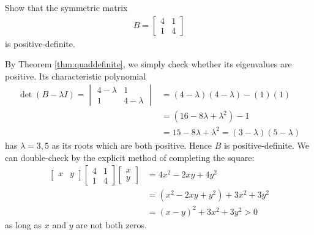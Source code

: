 \begin{exmp}
Show that the symmetric matrix
\begin{align*}
B = 
\begin{bmatrix}
4 & 1 \\
1 & 4
\end{bmatrix}
\end{align*}
is positive-definite.
\end{exmp}
\begin{solution}
By Theorem \ref{thm:quaddefinite}, we simply check whether its eigenvalues are positive. Its characteristic polynomial
\begin{align*}
\det(B-\lambda I) =
\begin{vmatrix}
4 - \lambda & 1 \\
1 & 4 - \lambda
\end{vmatrix}
&= (4-\lambda)(4-\lambda) - (1)(1) \\
&= (16 - 8\lambda + \lambda^2) - 1 \\
&= 15 - 8\lambda + \lambda^2 = (3-\lambda)(5-\lambda)
\end{align*}
has $\lambda = 3,5$ as its roots which are both positive. Hence $B$ is positive-definite. We can double-check by the explicit method of completing the square:
\begin{align*}
\begin{bmatrix}
x & y
\end{bmatrix}
\begin{bmatrix}
4 & 1 \\
1 & 4
\end{bmatrix}
\begin{bmatrix}
x \\
y 
\end{bmatrix}
&= 4x^2 - 2xy + 4y^2 \\
&= (x^2 - 2xy + y^2) + 3x^2 + 3y^2 \\
&= (x-y)^2 + 3x^2 + 3y^2 > 0
\end{align*}
as long as $x$ and $y$ are not both zeros.
\end{solution}

